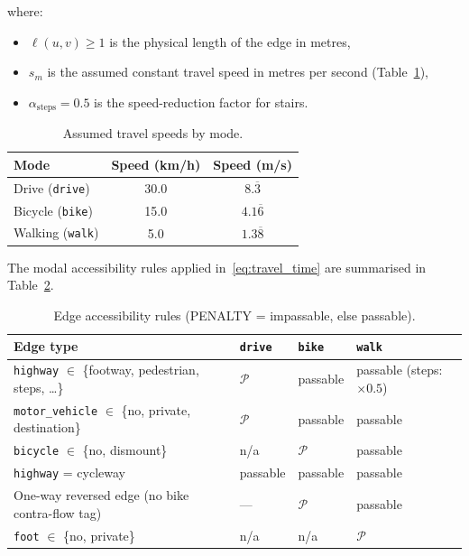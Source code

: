 \documentclass[12pt, a4paper]{article}
\theoremstyle{definition}
\begin{document}
\noindent where:
\begin{itemize}
  \item $\ell(u,v) \geq 1$ is the physical length of the edge in metres,
  \item $s_m$ is the assumed constant travel speed in metres per second
        (Table~\ref{tab:speeds}),
  \item $\alpha_{\text{steps}} = 0.5$ is the speed-reduction factor for stairs.
\end{itemize}

\begin{table}[h]
  \centering
  \caption{Assumed travel speeds by mode.}
  \label{tab:speeds}
  \begin{tabular}{lcc}
    \toprule
    Mode & Speed (km/h) & Speed (m/s) \\
    \midrule
    Drive (\texttt{drive}) & 30.0 & $8.\overline{3}$ \\
    Bicycle (\texttt{bike}) & 15.0 & $4.1\overline{6}$ \\
    Walking (\texttt{walk}) & 5.0  & $1.3\overline{8}$ \\
    \bottomrule
  \end{tabular}
\end{table}

The modal accessibility rules applied in~\eqref{eq:travel_time} are
summarised in Table~\ref{tab:modal_rules}.

\begin{table}[h]
  \centering
  \caption{Edge accessibility rules (PENALTY = impassable, else passable).}
  \label{tab:modal_rules}
  \small
  \begin{tabular}{lp{4.8cm}p{4.8cm}p{3.5cm}}
    \toprule
    Edge type & \texttt{drive} & \texttt{bike} & \texttt{walk} \\
    \midrule
    \texttt{highway} $\in$ \{footway, pedestrian, steps, \ldots\}
      & $\mathcal{P}$ & passable & passable (steps: $\times 0.5$) \\
    \texttt{motor\_vehicle} $\in$ \{no, private, destination\}
      & $\mathcal{P}$ & passable & passable \\
    \texttt{bicycle} $\in$ \{no, dismount\}
      & n/a & $\mathcal{P}$ & passable \\
    \texttt{highway} = cycleway
      & passable & passable & passable \\
    One-way reversed edge (no bike contra-flow tag)
      & --- & $\mathcal{P}$ & passable \\
    \texttt{foot} $\in$ \{no, private\}
      & n/a & n/a & $\mathcal{P}$ \\
    \bottomrule
  \end{tabular}
\end{table}
\end{document}
